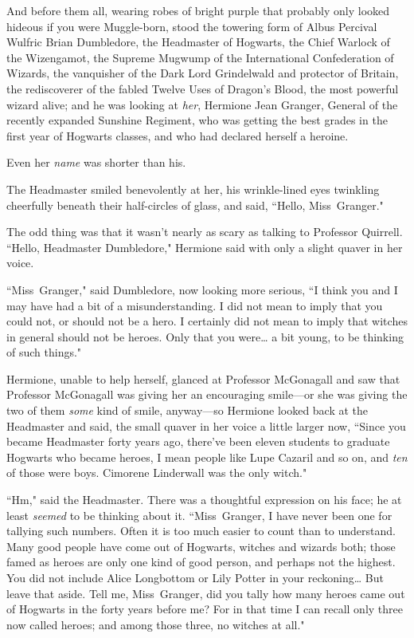 And before them all, wearing robes of bright purple that probably only looked hideous if you were Muggle-born, stood the towering form of Albus Percival Wulfric Brian Dumbledore, the Headmaster of Hogwarts, the Chief Warlock of the Wizengamot, the Supreme Mugwump of the International Confederation of Wizards, the vanquisher of the Dark Lord Grindelwald and protector of Britain, the rediscoverer of the fabled Twelve Uses of Dragon's Blood, the most powerful wizard alive; and he was looking at \emph{her}, Hermione Jean Granger, General of the recently expanded Sunshine Regiment, who was getting the best grades in the first year of Hogwarts classes, and who had declared herself a heroine.

Even her \emph{name} was shorter than his.

The Headmaster smiled benevolently at her, his wrinkle-lined eyes twinkling cheerfully beneath their half-circles of glass, and said, ``Hello, Miss~Granger."

The odd thing was that it wasn't nearly as scary as talking to Professor Quirrell. ``Hello, Headmaster Dumbledore," Hermione said with only a slight quaver in her voice.

``Miss~Granger," said Dumbledore, now looking more serious, ``I think you and I may have had a bit of a misunderstanding. I did not mean to imply that you could not, or should not be a hero. I certainly did not mean to imply that witches in general should not be heroes. Only that you were{\ldots} a bit young, to be thinking of such things."

Hermione, unable to help herself, glanced at Professor McGonagall and saw that Professor McGonagall was giving her an encouraging smile—or she was giving the two of them \emph{some} kind of smile, anyway—so Hermione looked back at the Headmaster and said, the small quaver in her voice a little larger now, ``Since you became Headmaster forty years ago, there've been eleven students to graduate Hogwarts who became heroes, I mean people like Lupe Cazaril and so on, and \emph{ten} of those were boys. Cimorene Linderwall was the only witch."

``Hm," said the Headmaster. There was a thoughtful expression on his face; he at least \emph{seemed} to be thinking about it. ``Miss~Granger, I have never been one for tallying such numbers. Often it is too much easier to count than to understand. Many good people have come out of Hogwarts, witches and wizards both; those famed as heroes are only one kind of good person, and perhaps not the highest. You did not include Alice Longbottom or Lily Potter in your reckoning{\ldots} But leave that aside. Tell me, Miss~Granger, did you tally how many heroes came out of Hogwarts in the forty years before me? For in that time I can recall only three now called heroes; and among those three, no witches at all."

